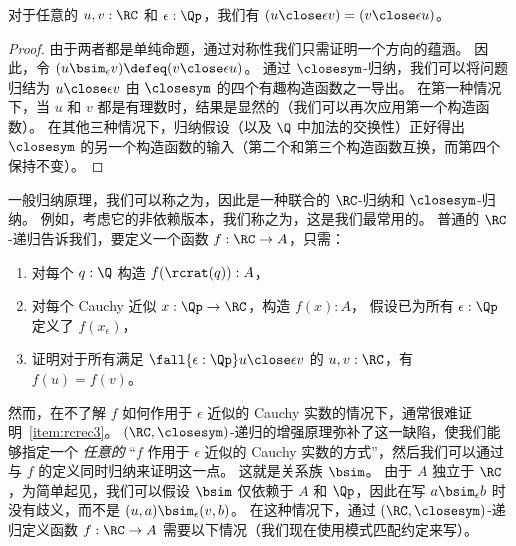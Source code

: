 \begin{lem}\label{thm:RCsim-symmetric}
对于任意的 $u,v:\RC$ 和 $\epsilon:\Qp$，我们有 $(u\close\epsilon v) = (v\close\epsilon u)$。
\end{lem}
\begin{proof}
  由于两者都是单纯命题，通过对称性我们只需证明一个方向的蕴涵。
  因此，令 $(u\bsim_\epsilon v) \defeq (v\close\epsilon u)$。
  通过 $\closesym$-归纳，我们可以将问题归结为 $u\close\epsilon v$ 由 $\closesym$ 的四个有趣构造函数之一导出。
  在第一种情况下，当 $u$ 和 $v$ 都是有理数时，结果是显然的（我们可以再次应用第一个构造函数）。
  在其他三种情况下，归纳假设（以及 $\Q$ 中加法的交换性）正好得出 $\closesym$ 的另一个构造函数的输入（第二个和第三个构造函数互换，而第四个保持不变）。
\end{proof}

一般归纳原理，我们可以称之为，因此是一种联合的 $\RC$-归纳和 $\closesym$-归纳。
例如，考虑它的非依赖版本，我们称之为，这是我们最常用的。
%
普通的 $\RC$-递归告诉我们，要定义一个函数 $f : \RC \to A$，只需：
\begin{enumerate}
  \item 对每个 $q : \Q$ 构造 $f(\rcrat(q)) : A$，
  \item 对每个 Cauchy 近似 $x : \Qp \to \RC$，构造 $f(x) : A$，
  假设已为所有 $\epsilon : \Qp$ 定义了 $f(x_\epsilon)$，
  \item 证明对于所有满足 $\fall{\epsilon:\Qp} u\close\epsilon v$ 的 $u, v : \RC$，有 $f(u) = f(v)$。\label{item:rcrec3}
\end{enumerate}
然而，在不了解 $f$ 如何作用于 $\epsilon$ 近似的 Cauchy 实数的情况下，通常很难证明~\ref{item:rcrec3}。
$(\RC,\closesym)$-递归的增强原理弥补了这一缺陷，使我们能够指定一个 \emph{任意的} ``$f$ 作用于 $\epsilon$ 近似的 Cauchy 实数的方式''，然后我们可以通过与 $f$ 的定义同时归纳来证明这一点。
这就是关系族 $\bsim$。
由于 $A$ 独立于 $\RC$，为简单起见，我们可以假设 $\bsim$ 仅依赖于 $A$ 和 $\Qp$，因此在写 $a\bsim_\epsilon b$ 时没有歧义，而不是 $(u,a) \bsim_\epsilon (v,b)$。
在这种情况下，通过 $(\RC,\closesym)$-递归定义函数 $f:\RC\to A$ 需要以下情况（我们现在使用模式匹配约定来写）。
